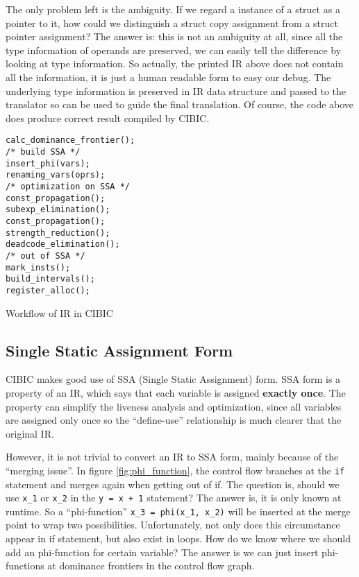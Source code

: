 \documentclass[10pt, a4paper]{article}
\begin{document}
\begin{enumerate}
    The only problem left is the ambiguity. If we regard a instance of a struct
    as a pointer to it, how could we distinguish a struct copy assignment from
    a struct pointer assignment? The answer is: this is not an ambiguity at
    all, since all the type information of operands are preserved, we can
    easily tell the difference by looking at type information. So actually, the
    printed IR above does not contain all the information, it is just a human
    readable form to easy our debug. The underlying type information is
    preserved in IR data structure and passed to the translator so can be used
    to guide the final translation. Of course, the code above does produce
    correct result compiled by CIBIC.
\end{enumerate}

\begin{listing}[H]
    \centering
    \begin{verbatim}
calc_dominance_frontier();
/* build SSA */
insert_phi(vars);
renaming_vars(oprs);
/* optimization on SSA */
const_propagation();
subexp_elimination();
const_propagation();
strength_reduction();
deadcode_elimination();
/* out of SSA */
mark_insts();
build_intervals();
register_alloc();
    \end{verbatim}
    \caption{Workflow of IR in CIBIC}
    \label{list:workflow}
\end{listing}

\subsection{Single Static Assignment Form}
CIBIC makes good use of SSA (Single Static Assignment) form. SSA form is a
property of an IR, which says that each variable is assigned \textbf{exactly
once}. The property can simplify the liveness analysis and optimization, since
all variables are assigned only once so the ``define-use'' relationship is much
clearer that the original IR.

However, it is not trivial to convert an IR to SSA form, mainly because of the
``merging issue''. In figure \ref{fig:phi_function}, the control flow branches
at the \texttt{if} statement and merges again when getting out of if. The
question is, should we use \texttt{x\_1} or \texttt{x\_2} in the \texttt{y = x
+ 1} statement? The answer is, it is only known at runtime. So a
``phi-function'' \texttt{x\_3 = phi(x\_1, x\_2)} will be inserted at the merge
point to wrap two possibilities.  Unfortunately, not only does this
circumstance appear in if statement, but also exist in loops. How do we know
where we should add an phi-function for certain variable? The answer is we can
just insert phi-functions at dominance frontiers in the control flow graph.
\end{document}
